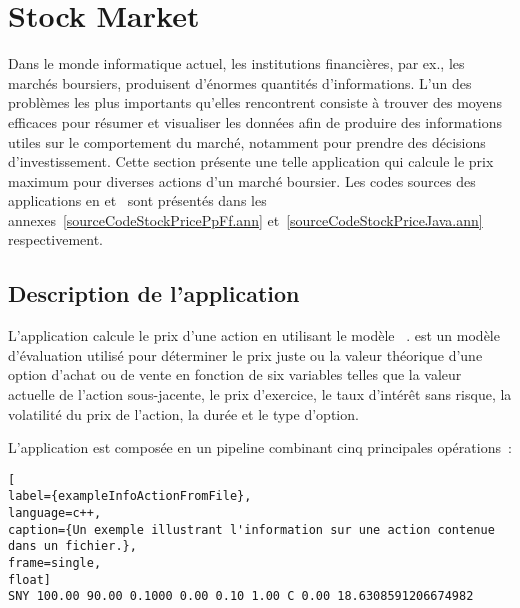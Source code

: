 \section{Stock Market}
\label{stockprice.sect}


Dans le monde informatique actuel, les institutions financi\`eres, par ex., les march\'es boursiers, produisent d'\'enormes quantit\'es d'informations. L'un des probl\`emes les plus importants qu'elles rencontrent consiste \`a trouver des moyens efficaces pour r\'esumer et visualiser les donn\'ees afin de produire des informations utiles sur le comportement du march\'e, notamment pour prendre des d\'ecisions d'investissement. Cette section pr\'esente une telle application qui calcule le prix maximum pour diverses actions d'un marché boursier. Les codes sources des applications  en  et~ sont pr\'esent\'es dans les annexes~\ref{sourceCodeStockPricePpFf.ann} et~\ref{sourceCodeStockPriceJava.ann} respectivement. 

\subsection{Description de l'application}

L'application  calcule le prix d'une action en utilisant le modèle ~\cite{macbeth1979empirical}.  est un mod\`ele d'\'evaluation utilis\'e pour d\'eterminer le prix juste ou la valeur th\'eorique d'une option d'achat ou de vente en fonction de six variables telles que la valeur actuelle de l'action sous-jacente, le prix d'exercice, le taux d'int\'er\^et sans risque, la volatilit\'e du prix de l'action, la dur\'ee et le type d'option. 

L'application  est compos\'ee en un pipeline combinant cinq principales op\'erations~: 

\begin{lstlisting}[
label={exampleInfoActionFromFile},
language=c++,
caption={Un exemple illustrant l'information sur une action contenue dans un fichier.},
frame=single,
float]
SNY	100.00 90.00 0.1000 0.00 0.10 1.00 C 0.00 18.6308591206674982
\end{lstlisting}

